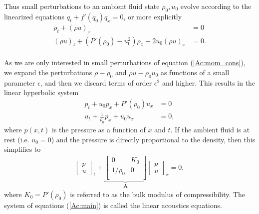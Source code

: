 \documentclass{SIAMbook2016}
\begin{document}
Thus small perturbations to an ambient fluid state \(\rho_0, u_0\)
evolve according to the linearized equations \(q_t + f'(q_0) q_x = 0\),
or more explicitly \begin{align*}
\rho_t + (\rho u)_x & = 0 \\
(\rho u)_t + (P'(\rho_0)-u_0^2)\rho_x + 2u_0(\rho u)_x & = 0.
\end{align*}\\
As we are only interested in small perturbations of equation
(\ref{Ac:mom_cons}), we expand the perturbations \(\rho-\rho_0\) and
\(\rho u - \rho_0 u_0\) as functions of a small parameter \(\epsilon\),
and then we discard terms of order \(\epsilon^2\) and higher. This
results in the linear hyperbolic system\\
\begin{align*}
p_t + u_0 p_x + P'(\rho_0) u_x & = 0 \\
u_t + \frac{1}{\rho_0} p_x + u_0 u_x & = 0,
\end{align*} where \(p(x,t)\) is the pressure as a function of \(x\) and
\(t\). If the ambient fluid is at rest (i.e. \(u_0=0\)) and the pressure
is directly proportional to the density, then this simplifies to
\begin{align} \label{Ac:main}
 \left[ \begin{array}{c}
p \\
u 
\end{array} \right]_t +  \underbrace{\left[ \begin{array}{cc}
0 & K_0 \\
1/\rho_0 & 0  \\
\end{array} \right]}_{\mathbf{A}}
\left[ \begin{array}{c}
p \\
u \end{array} \right]_x = 0,
\end{align} where \(K_0=P'(\rho_0)\) is referred to as the bulk modulus
of compressibility. The system of equations (\ref{Ac:main}) is called
the linear acoustics equations.
\end{document}
